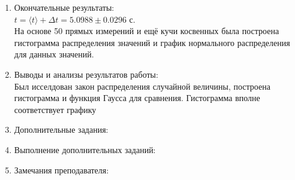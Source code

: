 \documentclass[12pt]{article}
\begin{document}
\begin{enumerate}
    \item Окончательные результаты: \\
    $t = \langle t\rangle + \Delta t = 5.0988 \pm 0.0296$ с. \\
    На основе 50 прямых измерений и ещё кучи косвенных была построена гистограмма распределения значений и график нормального распределения для данных значений.

    \item Выводы и анализы результатов работы: \\
    Был исселдован закон распределения случайной величины, построена гистограмма и функция Гаусса для сравнения. Гистограмма вполне соответствует графику
    
    \item Дополнительные задания:

    \item Выполнение дополнительных заданий:

    \item Замечания преподавателя:    
\end{enumerate}
\end{document}

